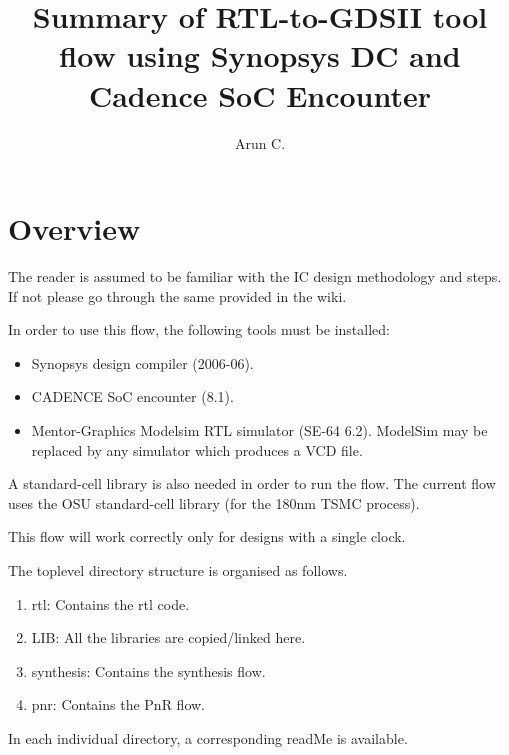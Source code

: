 \documentclass[12pt]{article}
\title{Summary of RTL-to-GDSII tool flow using Synopsys DC and Cadence SoC Encounter}
\author{Arun C.}
\begin{document}
  \maketitle
  
  
  \section{Overview}
  
  The reader is assumed to be familiar with the IC design methodology and steps. 
  If not please go through the same provided in the wiki.
  
  In order to use this flow, the following tools must be installed:
  \begin{itemize}
  \item Synopsys design compiler (2006-06). 
  \item CADENCE SoC encounter (8.1). 
  \item Mentor-Graphics Modelsim RTL simulator (SE-64 6.2).
        ModelSim may be replaced by any simulator which produces a VCD file.
  \end{itemize}
  
  A standard-cell library is also needed in order to run the flow. The current flow uses the OSU 
  standard-cell library (for the 180nm TSMC process). 
  
  This flow will work correctly only for designs with a single clock.
  
  The toplevel directory structure is organised as follows.
  \begin{enumerate}
  \item  rtl: Contains the rtl code.
  \item LIB: All the libraries are copied/linked here.
  \item synthesis: Contains the synthesis flow.
  \item pnr: Contains the PnR flow.
  \end{enumerate}
  In each individual directory, a corresponding readMe is available.
  
\end{document}
